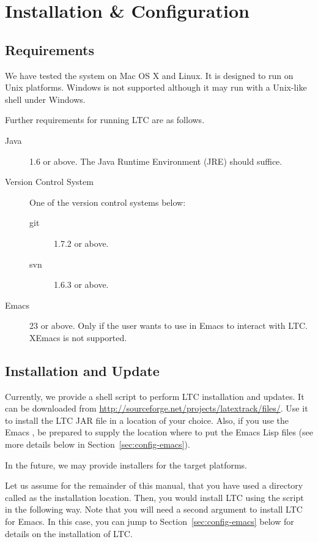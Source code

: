 \chapter{Installation \& Configuration} \label{ch:install}

\section{Requirements}

We have tested the system on Mac OS X and Linux. It is designed to run on Unix platforms. Windows is not supported although it may run with a Unix-like shell under Windows.

Further requirements for running LTC are as follows.
\begin{description}
\item[Java] 1.6 or above.  The Java Runtime Environment (JRE) should suffice.
\item[Version Control System]  One of the version control systems below:
  \begin{description}
  \item[git] 1.7.2 or above.
  \item[svn] 1.6.3 or above.
  \end{description}
\item[Emacs] 23 or above.  Only if the user wants to use  in Emacs to interact with LTC.  XEmacs is not supported.
\end{description}

\section{Installation and Update}

Currently, we provide a shell script  to perform LTC installation and updates.  It can be downloaded from \url{http://sourceforge.net/projects/latextrack/files/}.  Use it to install the LTC JAR file in a location of your choice.  Also, if you use the Emacs , be prepared to supply the location where to put the Emacs Lisp files (see more details below in Section~\ref{sec:config-emacs}).

In the future, we may provide installers for the target platforms.

Let us assume for the remainder of this manual, that you have used a directory called  as the installation location. Then, you would install LTC using the script in the following way.  Note that you will need a second argument to install LTC for Emacs.  In this case, you can jump to Section~\ref{sec:config-emacs} below for details on the installation of LTC.

